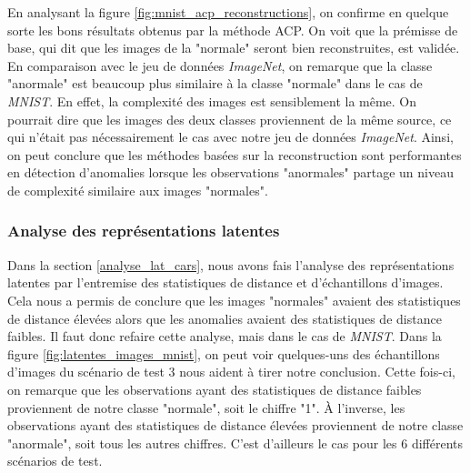 En analysant la figure \ref{fig:mnist_acp_reconstructions}, on confirme en quelque sorte les bons résultats obtenus par la méthode ACP. On voit que la prémisse de base, qui dit que les images de la "normale" seront bien reconstruites, est validée. En comparaison avec le jeu de données  \textit{ImageNet}, on remarque que la classe "anormale" est beaucoup plus similaire à la classe "normale" dans le cas de \textit{MNIST}. En effet, la complexité des images est sensiblement la même. On pourrait dire que les images des deux classes proviennent de la même source, ce qui n'était pas nécessairement le cas avec notre jeu de données \textit{ImageNet}. Ainsi, on peut conclure que les méthodes basées sur la reconstruction sont performantes en détection d'anomalies lorsque les observations "anormales" partage un niveau de complexité similaire aux images "normales".

\subsubsection{Analyse des représentations latentes} 

Dans la section \ref{analyse_lat_cars}, nous avons fais l'analyse des représentations latentes par l'entremise des statistiques de distance et d'échantillons d'images. Cela nous a permis de conclure que les images "normales" avaient des statistiques de distance élevées alors que les anomalies avaient des statistiques de distance faibles. Il faut donc refaire cette analyse, mais dans le cas de \textit{MNIST}. Dans la figure \ref{fig:latentes_images_mnist}, on peut voir quelques-uns des échantillons d'images du scénario de test 3 nous aident à tirer notre conclusion. Cette fois-ci, on remarque que les observations ayant des statistiques de distance faibles proviennent de notre classe "normale", soit le chiffre "1". À l'inverse, les observations ayant des statistiques de distance élevées proviennent de notre classe "anormale", soit tous les autres chiffres. C'est d'ailleurs le cas pour les 6 différents scénarios de test.

